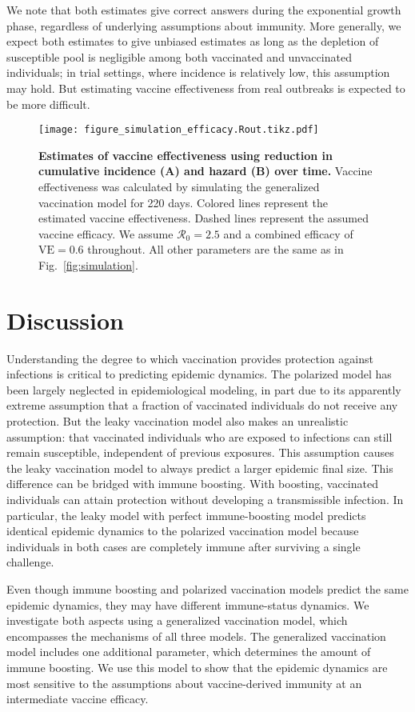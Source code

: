 \documentclass[12pt]{article}
\newcommand{\fref}[1]{Fig.~\ref{fig:#1}}
\newcommand{\Rx}[1]{\ensuremath{{\mathcal R}_{#1}}\xspace}
\newcommand{\Ro}{\Rx{0}}
\newcommand{\VE}{\ensuremath{\mathrm{VE}}}
\begin{document}
We note that both estimates give correct answers during the exponential growth phase, regardless of underlying assumptions about immunity.
More generally, we expect both estimates to give unbiased estimates as long as the depletion of susceptible pool is negligible among both vaccinated and unvaccinated individuals;
in trial settings, where incidence is relatively low, this assumption may hold.
But estimating vaccine effectiveness from real outbreaks is expected to be more difficult.

\begin{figure}[!th]
\texttt{[image: figure\_simulation\_efficacy.Rout.tikz.pdf]}
\caption{
\textbf{Estimates of vaccine effectiveness using reduction in cumulative incidence (A) and hazard (B) over time.}
Vaccine effectiveness was calculated by simulating the generalized vaccination model for 220 days. 
Colored lines represent the estimated vaccine effectiveness.
Dashed lines represent the assumed vaccine efficacy.
We assume $\Ro = 2.5$ and a combined efficacy of $\VE = 0.6$ throughout. 
All other parameters are the same as in \fref{simulation}.
\label{fig:efficacy}
}
\end{figure}

\section*{Discussion}

Understanding the degree to which vaccination provides protection against infections is critical to predicting epidemic dynamics.
The polarized model has been largely neglected in epidemiological modeling, in part due to its apparently extreme assumption that a fraction of vaccinated individuals do not receive any protection. 
But the leaky vaccination model also makes an unrealistic assumption: that vaccinated individuals who are exposed to infections can still remain susceptible, independent of previous exposures. 
This assumption causes the leaky vaccination model to always predict a larger epidemic final size.
This difference can be bridged with immune boosting. 
With boosting, vaccinated individuals can attain protection without developing a transmissible infection.
In particular, the leaky model with perfect immune-boosting model predicts identical epidemic dynamics to the polarized vaccination model because individuals in both cases are completely immune after surviving a single challenge. 

Even though immune boosting and polarized vaccination models predict the same epidemic dynamics, they may have different immune-status dynamics.
We investigate both aspects using a generalized vaccination model, which encompasses the mechanisms of all three models.
The generalized vaccination model includes one additional parameter, which determines the amount of immune boosting.
We use this model to show that the epidemic dynamics are most sensitive to the assumptions about vaccine-derived immunity at an intermediate vaccine efficacy.
\end{document}
